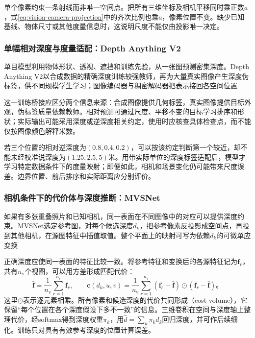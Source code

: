 单个像素约束一条射线而非唯一空间点。把所有三维坐标及相机平移同时乘正数$a$，式\eqref{eq:vision-camera-projection}中的齐次比例也乘$a$，像素位置不变。缺少已知基线、物体尺寸或其他度量信息时，这说明尺度不能仅由投影唯一决定。

\subsubsection{单幅相对深度与度量适配：Depth Anything V2}
\label{sec:vision-recognition-depth-anything}

单目模型利用物体形状、透视、遮挡和训练先验，从一张图预测密集深度。Depth Anything V2以合成数据的精确深度训练较强教师，再为大量真实图像产生深度伪标签，供不同规模学生学习；图像编码器与稠密解码器把表示接回各空间位置

这一训练桥接应区分两个信息来源：合成图像提供几何标签，真实图像提供目标外观，伪标签质量依赖教师。相对预测可通过尺度、平移不变的目标学习排序和形状；实际输出可能采用深度或逆深度相关约定，使用时应核查具体检查点，而不能仅按图像颜色解释米数。

若三个位置的相对逆深度为$(0.8,0.4,0.2)$，可以按该约定判断第一个较近，却不能未经校准说深度为$(1.25,2.5,5)$米。用带实际单位的深度标签适配后，模型才学习特定数据条件下的度量映射；即便如此，相机和场景变化仍可能带来尺度误差。边界位置、前后排序和实际距离应分别评价。

\subsubsection{相机条件下的代价体与深度推断：MVSNet}
\label{sec:vision-recognition-mvsnet}

如果有多张重叠照片和已知相机，同一表面在不同图像中的对应可以提供深度约束。MVSNet选定参考图，对每个候选深度$d_k$，把参考像素反投影成空间点，再投到其他相机，在源图特征中插值取值。整个平面上的映射可写为依赖$d_k$的可微单应变换

正确深度应使同一表面的特征比较一致。将参考特征和变换后的各源特征记为$\bm{f}_r$，共有$n_{\mathrm{v}}$个视图，可以用方差形成匹配代价：
\begin{equation}
 \bar{\bm{f}}=\frac1{n_{\mathrm{v}}}\sum_{r=1}^{n_{\mathrm{v}}}\bm{f}_r,\qquad
 \bm{c}(d_k,u,v)=\frac1{n_{\mathrm{v}}}\sum_{r=1}^{n_{\mathrm{v}}}
   (\bm{f}_r-\bar{\bm{f}})\odot(\bm{f}_r-\bar{\bm{f}})\text{。}
 \label{eq:vision-mvs-cost}
\end{equation}
这里$\odot$表示逐元素相乘。所有像素和候选深度的代价共同形成（cost volume），它保留“每个位置在各个深度假设下多不一致”的信息。三维卷积在空间与深度轴上整理代价，经softmax得到深度权重$\pi_k$，用$\hat d=\sum_k\pi_kd_k$回归深度，并可作后续细化。训练只对具有有效参考深度的位置计算误差。

